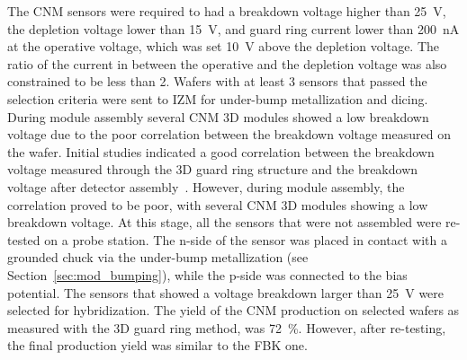 The CNM sensors were required to had a breakdown voltage higher than \SI{25}{\volt}, the depletion voltage lower than \SI{15}{\volt}, and guard ring current lower than \SI{200}{\nano\ampere} at the operative voltage, which was set \SI{10}{\volt} above the depletion voltage. The ratio of the current in between the operative and the depletion voltage was also constrained to be less than 2. Wafers with at least 3 sensors that passed the selection criteria were sent to IZM for under-bump metallization and dicing.\cite{Nanni_3D}\\
During module assembly several CNM 3D modules showed a low breakdown voltage due to the poor correlation between the breakdown voltage measured on the wafer.
Initial studies indicated a good correlation between the breakdown voltage measured through the 3D guard ring structure and the breakdown voltage after detector assembly~\cite{IBL_mod_proto}.  However, during module assembly, the correlation proved to be poor, with several CNM 3D modules showing a low breakdown voltage. At this stage, all the sensors that were not assembled were re-tested on a probe station.  The n-side of the sensor was placed in contact with a grounded chuck via the under-bump metallization (see Section~\ref{sec:mod_bumping}), while the p-side was connected to the bias potential.  The sensors that showed a voltage breakdown larger than \SI{25}{\volt} were selected for hybridization. The yield of the CNM production on selected wafers as measured with the 3D guard ring method, was \SI{72}{\percent}.  However, after re-testing, the final production yield was similar to the FBK one.





